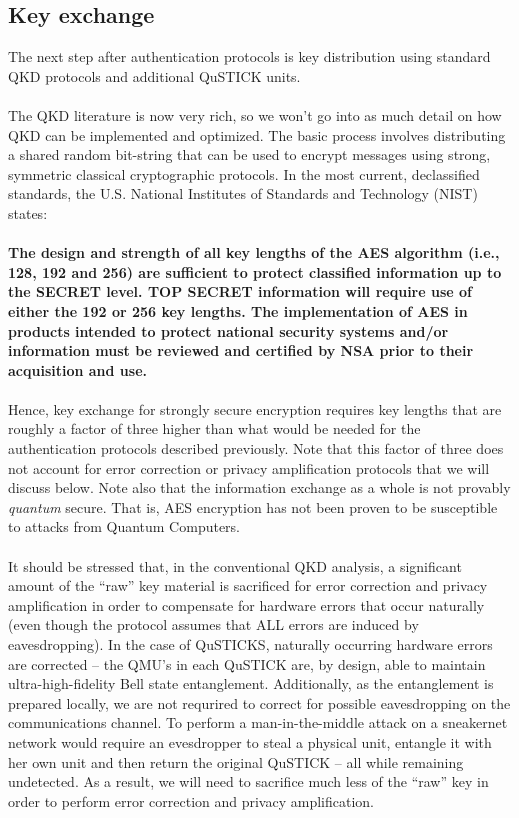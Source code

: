 \documentclass[aps,prl,twocolumn,10pt,nofootinbib]{revtex4}
\begin{document}
\subsection{Key exchange}
The next step after authentication protocols is key distribution using standard QKD protocols and additional QuSTICK units.  
\\
\\
The QKD literature is now very rich, so we won't go into as much detail on how QKD can be implemented and optimized.  The basic process involves distributing a shared random bit-string that can be used to encrypt messages using strong, symmetric classical cryptographic protocols.  In the most current, declassified standards, the U.S. National Institutes of Standards and Technology (NIST) states:
\\
\\
{\bf The design and strength of all key lengths of the AES algorithm (i.e., 128, 192 and 256) are sufficient to protect classified information up to the SECRET level. TOP SECRET information will require use of either the 192 or 256 key lengths. The implementation of AES in products intended to protect national security systems and/or information must be reviewed and certified by NSA prior to their acquisition and use.}
\\
\\
Hence, key exchange for strongly secure encryption requires key lengths that are roughly a factor of three higher than what would be needed for the authentication protocols described previously.  Note that this factor of three does not account for error correction or privacy amplification protocols that we will discuss below.  Note also that the information exchange as a whole is not provably {\em quantum} secure.  That is, AES encryption has not been proven to be susceptible to attacks from Quantum Computers.
\\
\\
It should be stressed that, in the conventional QKD analysis, a significant amount of the ``raw'' key material is sacrificed for error correction and privacy amplification in order to compensate for hardware errors that occur naturally (even though the protocol assumes that ALL errors are induced by eavesdropping).  In the case of QuSTICKS, naturally occurring hardware errors are corrected -- the QMU's in each QuSTICK are, by design, able to maintain ultra-high-fidelity Bell state entanglement.  Additionally, as the entanglement is prepared locally, we are not requrired to correct for possible eavesdropping on the communications channel.  To perform a man-in-the-middle attack on a sneakernet network would require an evesdropper to steal a physical unit, entangle it with her own unit and then return the original QuSTICK -- all while remaining undetected.   As a result, we will need to sacrifice much less of the ``raw'' key in order to perform error correction and privacy amplification. 
\end{document}
